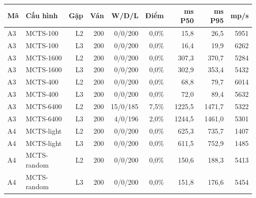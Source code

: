 \begin{center}\small
\begin{tabular}{@{}llrrrrrrr@{}}
\toprule
Mã & Cấu hình & Gặp & Ván & W/D/L & Điểm & ms P50 & ms P95 & mp/s \\
\midrule
A3 & MCTS-100 & L2 & 200 & 0/0/200 & 0,0\% & 15,8 & 26,5 & 5951 \\
A3 & MCTS-100 & L3 & 200 & 0/0/200 & 0,0\% & 16,4 & 19,9 & 6262 \\
A3 & MCTS-1600 & L2 & 200 & 0/0/200 & 0,0\% & 307,3 & 370,7 & 5284 \\
A3 & MCTS-1600 & L3 & 200 & 0/0/200 & 0,0\% & 302,9 & 353,4 & 5432 \\
A3 & MCTS-400 & L2 & 200 & 0/0/200 & 0,0\% & 68,8 & 79,7 & 6014 \\
A3 & MCTS-400 & L3 & 200 & 0/0/200 & 0,0\% & 72,0 & 89,4 & 5632 \\
A3 & MCTS-6400 & L2 & 200 & 15/0/185 & 7,5\% & 1225,5 & 1471,7 & 5322 \\
A3 & MCTS-6400 & L3 & 200 & 4/0/196 & 2,0\% & 1244,5 & 1461,0 & 5301 \\
A4 & MCTS-light & L2 & 200 & 0/0/200 & 0,0\% & 625,3 & 735,7 & 1407 \\
A4 & MCTS-light & L3 & 200 & 0/0/200 & 0,0\% & 611,5 & 752,9 & 1485 \\
A4 & MCTS-random & L2 & 200 & 0/0/200 & 0,0\% & 150,6 & 188,3 & 5413 \\
A4 & MCTS-random & L3 & 200 & 0/0/200 & 0,0\% & 151,8 & 176,6 & 5454 \\
\bottomrule
\end{tabular}
\end{center}